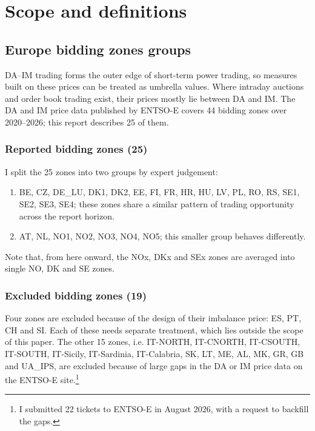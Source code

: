 \documentclass[11pt,a4paper]{article}
\begin{document}
\newpage
\section{Scope and definitions}

\subsection{Europe bidding zones groups}

DA--IM trading forms the outer edge of short-term power trading, so measures built on these prices can be treated as umbrella values. Where intraday auctions and order book trading exist, their prices mostly lie between DA and IM. The DA and IM price data published by ENTSO-E covers 44 bidding zones over 2020--2026; this report describes 25 of them.

\subsubsection{Reported bidding zones (25)}

I split the 25 zones into two groups by expert judgement:
\begin{enumerate}[label=(\Alph*)]
\item BE, CZ, DE\_LU, DK1, DK2, EE, FI, FR, HR, HU, LV, PL, RO, RS, SE1, SE2, SE3, SE4; these zones share a similar pattern of trading opportunity across the report horizon.
\item AT, NL, NO1, NO2, NO3, NO4, NO5; this smaller group behaves differently.
\end{enumerate}

Note that, from here onward, the NOx, DKx and SEx zones are averaged into single NO, DK and SE zones.

\subsubsection{Excluded bidding zones (19)}

Four zones are excluded because of the design of their imbalance price: ES, PT, CH and SI. Each of these needs separate treatment, which lies outside the scope of this paper. The other 15 zones, i.e. IT-NORTH, IT-CNORTH, IT-CSOUTH, IT-SOUTH, IT-Sicily, IT-Sardinia, IT-Calabria, SK, LT, ME, AL, MK, GR, GB and UA\_IPS, are excluded because of large gaps in the DA or IM price data on the ENTSO-E site.\footnote{I submitted 22 tickets to ENTSO-E in August 2026, with a request to backfill the gaps.}
\end{document}
